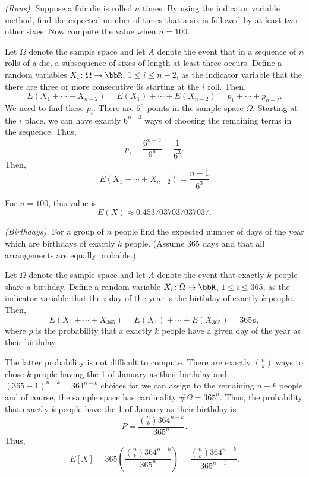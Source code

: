 \begin{problem}[Handout 6, \# 9]
  \emph{(Runs).} Suppose a fair die is rolled \(n\) times. By using the
  indicator variable method, find the expected number of times that a six
  is followed by at least two other sixes. Now compute the value when
  \(n=100\).
\end{problem}
\begin{solution}
  Let \(\Omega\) denote the sample space and let \(A\) denote the event
  that in a sequence of \(n\) rolls of a die, a subsequence of sixes of
  length at least three occurs. Define a random variables
  \(X_i\colon\Omega\to\bbR\), \(1\leq i\leq n-2\), as the indicator
  variable that the there are three or more consecutive \(6\)s starting at
  the \(i\) roll. Then,
  \[
    E(X_1+\dotsb+X_{n-2})=E(X_1)+\dotsb+E(X_{n-2})=p_1+\dotsb+p_{n-2}.
  \]
  We need to find these \(p_i\). There are \(6^n\) points in the sample
  space \(\Omega\). Starting at the \(i\) place, we can have
  exactly \(6^{n-3}\) ways of choosing the remaining terms in the
  sequence. Thus,
  \[
    p_i=\frac{6^{n-3}}{6^n}=\frac{1}{6^3}.
  \]
  Then,
  \[
    E(X_1+\dotsb+X_{n-2})=\frac{n-1}{6^3}
  \]

  For \(n=100\), this value is
  \[
    E(X)\approx\num{0.4537037037037037}.
  \]
\end{solution}
\newpage

\begin{problem}[Handout 6, \# 10]
  \emph{(Birthdays).} For a group of \(n\) people find the expected number
  of days of the year which are birthdays of exactly \(k\) people. (Assume
  \(365\) days and that all arrangements are equally probable.)
\end{problem}
\begin{solution}
  Let \(\Omega\) denote the sample space and let \(A\) denote the event
  that exactly \(k\) people share a birthday. Define a random variable
  \(X_i\colon\Omega\to\bbR\), \(1\leq i\leq 365\), as the indicator
  variable that the \(i\) day of the year is the birthday of
  exactly \(k\) people. Then,
  \[
    E(X_1+\dotsb+X_{365})=E(X_1)+\dotsb+E(X_{365})=365p,
  \]
  where \(p\) is the probability that a exactly \(k\) people have a given
  day of the year as their birthday.

  The latter probability is not difficult to compute. There are exactly
  \(\binom{n}{k}\) ways to chose \(k\) people having the 1 of
  January as their birthday and \((365-1)^{n-k}=364^{n-k}\) choices for we
  can assign to the remaining \(n-k\) people and of course, the sample
  space has cardinality \(\#\Omega=365^n\). Thus, the probability that
  exactly \(k\) people have the 1 of January as their birthday
  is
  \[
    P=\frac{\binom{n}{k}364^{n-k}}{365^n}.
  \]
  Thus,
  \[
    E[X]
    =365\left(\frac{\binom{n}{k}364^{n-k}}{365^n}\right)
    =\frac{\binom{n}{k}364^{n-k}}{365^{n-1}}.
  \]
\end{solution}
\newpage

